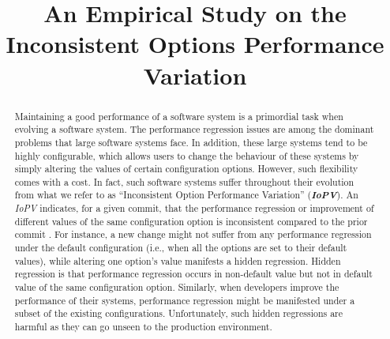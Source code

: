\documentclass[smallextended]{svjour3}       %
\newcommand{\inconsistent}{{\em IoPV}\xspace}
\newcommand{\bram}[1]{\textcolor{orange}{{\it [Bram says: #1]}}}
\begin{document}
\title{An Empirical Study on the Inconsistent Options Performance Variation}

\newcommand{\PQI}{How common are \inconsistent issues? }
\newcommand{\PQII}{How difficult is it to manually identify \inconsistent issues?}

\newcommand{\RQI}{What is the impact of configuration on performance regression?}
\newcommand{\RQII}{How accurately can we predict \inconsistent issues? }
\newcommand{\RQIII}{What are the most important metrics for predicting \inconsistent issues? }

\author{
}

\maketitle
\begin{abstract}
Maintaining a good performance of a software system is a primordial task when evolving a software system. The performance regression issues are among the dominant problems that large software systems face. In addition, these large systems tend to be highly configurable, which allows users to change the behaviour of these systems by simply altering the values of certain configuration options. However, such flexibility comes with a cost. In fact, such software systems suffer throughout their evolution from what we refer to as ``Inconsistent Option Performance Variation'' (\textbf{\inconsistent}). An \inconsistent indicates, for a given commit, that the performance regression or improvement of different values of the same configuration option is inconsistent compared to the prior commit%
. For instance, a new change might not suffer from any performance regression under the default configuration (i.e., when all the options are set to their default values), while altering one option's value manifests a hidden regression. %
Hidden regression is that performance regression occurs in non-default value but not in default value of the same configuration option. Similarly, when developers improve the performance of their systems, performance regression might be manifested under a subset of the existing configurations. %
Unfortunately, such hidden regressions are harmful as they can go unseen to the production environment. %

\end{abstract}
\end{document}
